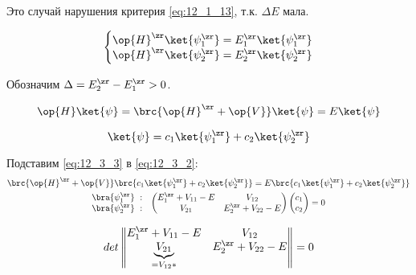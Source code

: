 Это случай нарушения критерия \eqref{eq:12_1_13}, т.к. $\Delta E$ мала.

\begin{equation}
\label{eq:12_3_1}
\left \{ 
\begin{matrix}
\op{H}^\zr \ket{\psi_1^\zr} = E_1^\zr \ket{\psi_1^\zr} \\
\op{H}^\zr \ket{\psi_2^\zr} = E_2^\zr \ket{\psi_2^\zr}
\end{matrix}
\right .
\end{equation}  

Обозначим $\Delta = E_2^\zr - E_1 ^\zr > 0$.

\begin{equation}
\label{eq:12_3_2}
\op{H} \ket{\psi} = \brc{\op{H}^\zr + \op{V}} \ket{\psi} = E \ket{\psi}
\end{equation}

\begin{equation}
\label{eq:12_3_3}
\ket{\psi} = c_1 \ket{\psi_1^\zr} + c_2 \ket{\psi_2^\zr} 
\end{equation}

Подставим \eqref{eq:12_3_3} в \eqref{eq:12_3_2}:
\begin{gather*}
\brc{\op{H}^\zr + \op{V}}\brc{c_1 \ket{\psi_1^\zr} + c_2 \ket{\psi_2^\zr}} = E \brc{c_1 \ket{\psi_1^\zr} + c_2 \ket{\psi_2^\zr}} \\
  \begin{matrix}
    \begin{matrix}
      \bra{\psi_1^\zr}~: \\
      \bra{\psi_2^\zr}~:
    \end{matrix} &
    \begin{pmatrix}
      E_1^\zr + V_{11} - E & V_{12} \\
      V_{21} & E_2^\zr + V_{22} - E
    \end{pmatrix} 
    \begin{pmatrix}
      c_1\\
      c_2
    \end{pmatrix} 
     = 0
  \end{matrix}
\end{gather*}

\begin{equation}
\label{eq:12_3_4}
det \left \| \begin{matrix}
E_1^\zr + V_{11} - E & V_{12} \\ 
\underbrace{V_{21}}_{=V_{12}*} & E_2^\zr + V_{22} - E
\end{matrix}
\right \| = 0
\end{equation}

